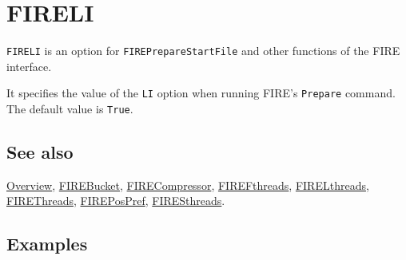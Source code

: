 \documentclass[../FeynHelpersManual.tex]{subfiles}
\begin{document}
\begin{Shaded}
\begin{Highlighting}[]
 
\end{Highlighting}
\end{Shaded}

\hypertarget{fireli}{
\section{FIRELI}\label{fireli}}

\texttt{FIRELI} is an option for \texttt{FIREPrepareStartFile} and other
functions of the FIRE interface.

It specifies the value of the \texttt{LI} option when running FIRE's
\texttt{Prepare} command. The default value is \texttt{True}.

\subsection{See also}

\hyperlink{toc}{Overview}, \hyperlink{firebucket}{FIREBucket},
\hyperlink{firecompressor}{FIRECompressor},
\hyperlink{firefthreads}{FIREFthreads},
\hyperlink{firelthreads}{FIRELthreads},
\hyperlink{firethreads}{FIREThreads},
\hyperlink{firepospref}{FIREPosPref},
\hyperlink{firesthreads}{FIRESthreads}.

\subsection{Examples}
\end{document}
